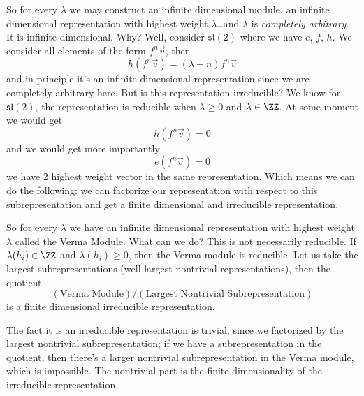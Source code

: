 So for every $\lambda$ we may construct an infinite dimensional
module, an infinite dimensional representation with highest
weight $\lambda$\dots and $\lambda$ is \emph{completely arbitrary.}
It is infinite dimensional. Why? Well, consider
$\mathfrak{sl}(2)$ where we have $e$, $f$, $h$. We consider all
elements of the form $f^{n}\vec{v}$, then
\begin{equation}
h(f^{n}\vec{v})=(\lambda-n)f^{n}\vec{v}
\end{equation}
and in principle it's an infinite dimensional representation
since we are completely arbitrary here. But is this
representation irreducible? We know for $\mathfrak{sl}(2)$, the
representation is reducible when $\lambda\geq0$ and
$\lambda\in\ZZ$. At some moment we would get
\begin{equation}
h(f^{n}\vec{v})=0
\end{equation}
and we would get more importantly
\begin{equation}
e(f^{n}\vec{v})=0
\end{equation}
we have 2 highest weight vector in the same representation. Which
means we can do the following: we can factorize our
representation with respect to this subrepresentation and get a
finite dimensional and irreducible representation.

So for every $\lambda$ we have an infinite dimensional
representation with highest weight $\lambda$ called the Verma
Module. What can we do? This is not necessarily reducible. If
$\lambda(h_{i})\in\ZZ$ and $\lambda(h_{i})\geq0$, then the Verma
module is reducible. Let us take the largest subrepresentations
(well largest nontrivial representations), then the quotient
\begin{equation}
(\mbox{Verma Module})/(\mbox{Largest Nontrivial Subrepresentation})
\end{equation}
is a finite dimensional irreducible representation.

The fact it is an irreducible representation is trivial, since we
factorized by the largest nontrivial subrepresentation; if we
have a subrepresentation in the quotient, then there's a larger
nontrivial subrepresentation in the Verma module, which is
impossible. The nontrivial part is the finite dimensionality of
the irreducible representation.
